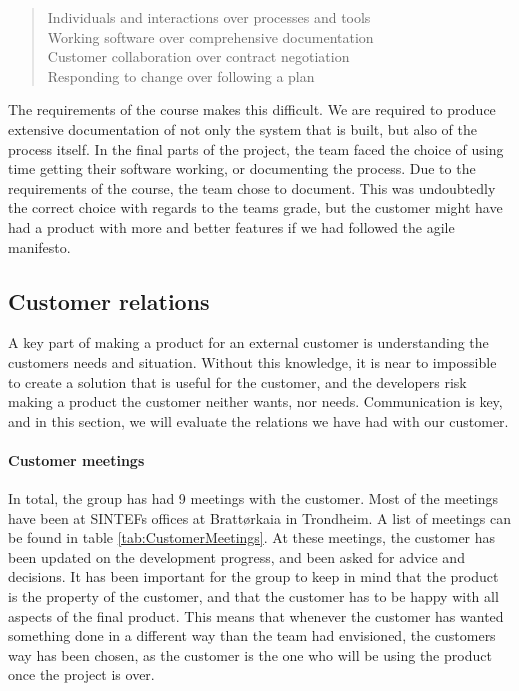 \documentclass[11pt,a4paper,titlepage,oneside]{report}
\begin{document}
\begin{quote}
Individuals and interactions over processes and tools \\
Working software over comprehensive documentation \\
Customer collaboration over contract negotiation \\
Responding to change over following a plan \cite{AgileManifesto}
\end{quote}

The requirements of the course makes this difficult. We are required to produce extensive documentation of not only the system that is built, but also of the process itself. In the final parts of the project, the team faced the choice of using time getting their software working, or documenting the process. Due to the requirements of the course, the team chose to document. This was undoubtedly the correct choice with regards to the teams grade, but the customer might have had a product with more and better features if we had followed the agile manifesto.

\subsection{Customer relations}
\label{subsec:CustomerRelations}
A key part of making a product for an external customer is understanding the customers needs and situation. Without this knowledge, it is near to impossible to create a solution that is useful for the customer, and the developers risk making a product the customer neither wants, nor needs. Communication is key, and in this section, we will evaluate the relations we have had with our customer. 

\paragraph{Customer meetings}
In total, the group has had 9 meetings with the customer. Most of the meetings have been at SINTEFs offices at Brattørkaia in Trondheim. A list of meetings can be found in table \ref{tab:CustomerMeetings}. At these meetings, the customer has been updated on the development progress, and been asked for advice and decisions. It has been important for the group to keep in mind that the product is the property of the customer, and that the customer has to be happy with all aspects of the final product. This means that whenever the customer has wanted something done in a different way than the team had envisioned, the customers way has been chosen, as the customer is the one who will be using the product once the project is over.
\end{document}

